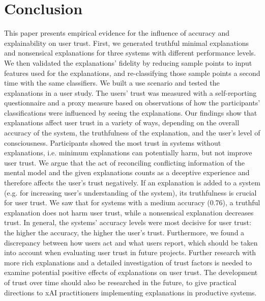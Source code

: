 \section{Conclusion}
This paper presents empirical evidence for the influence of accuracy and explainability on user trust. First, we generated truthful minimal explanations and nonsensical explanations for three systems with different performance levels. We then validated the explanations' fidelity by reducing sample points to input features used for the explanations, and re-classifying those sample points a second time with the same classifiers. We built a use scenario and tested the explanations in a user study. The users' trust was measured with a self-reporting questionnaire and a proxy measure based on observations of how the participants' classifications were influenced by seeing the explanations.\newline
Our findings show that explanations affect user trust in a variety of ways, depending on the overall accuracy of the system, the truthfulness of the explanation, and the user's level of consciousness. Participants showed the most trust in systems without explanations, i.e. minimum explanations can potentially harm, but not improve user trust. We argue that the act of reconciling conflicting information of the mental model and the given explanations counts as a deceptive experience and therefore affects the user's trust negatively. If an explanation is added to a system (e.g. for increasing user's understanding of the system), its truthfulness is crucial for user trust. We saw that for systems with a medium accuracy (0.76), a truthful explanation does not harm user trust, while a nonsensical explanation decreases trust. In general, the systems' accuracy levels were most decisive for user trust: the higher the accuracy, the higher the user's trust. Furthermore, we found a discrepancy between how users act and what users report, which should be taken into account when evaluating user trust in future projects.\newline
Further research with more rich explanations and a detailed investigation of trust factors is needed to examine potential positive effects of explanations on user trust. The development of trust over time should also be researched in the future, to give practical directions to xAI practitioners implementing explanations in productive systems.